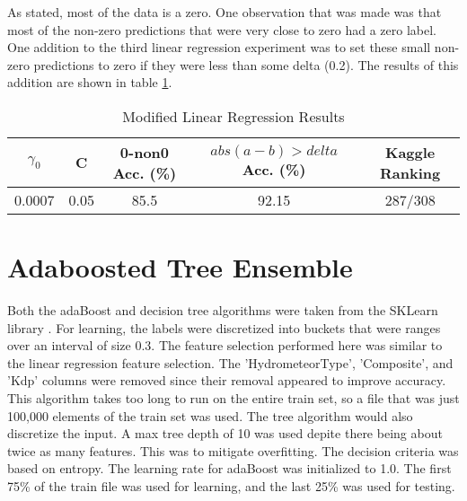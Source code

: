 \documentclass[pdftex,a4paper,11pt]{article}
\begin{document}
As stated, most of the data is a zero. One observation that was made was that most of the non-zero predictions that were very close to zero had a zero label. One addition to the third linear regression experiment was to set these small non-zero predictions to zero if they were less than some delta (0.2). The results of this addition are shown in table \ref{table:linAccModified}.
  \begin{table}[h]
        {\centering
          \begin{tabular}{|c|c|c|c|c|}
            \hline
             $\gamma_0$ & C & 0-non0 Acc. (\%) & $abs(a - b) > delta$ Acc. (\%) & Kaggle Ranking\\
            \hline
                0.0007 &   0.05        & 85.5 & 92.15 & 287/308 \\
            \hline
          \end{tabular}
          \caption{Modified Linear Regression Results}          
          \label{table:linAccModified}}
  \end{table}


\section{Adaboosted Tree Ensemble}
Both the adaBoost and decision tree algorithms were taken from the SKLearn library \cite{scikit-learn}. For learning, the labels were discretized into buckets that were ranges over an interval of size 0.3. The feature selection performed here was similar to the linear regression feature selection. The 'HydrometeorType', 'Composite', and 'Kdp' columns were removed since their removal appeared to improve accuracy. This algorithm takes too long to run on the entire train set, so a file that was just 100,000 elements of the train set was used. The tree algorithm would also discretize the input. A max tree depth of 10 was used depite there being about twice as many features. This was to mitigate overfitting. The decision criteria was based on entropy. The learning rate for adaBoost was initialized to 1.0. The first 75\% of the train file was used for learning, and the last 25\% was used for testing.
\end{document}

